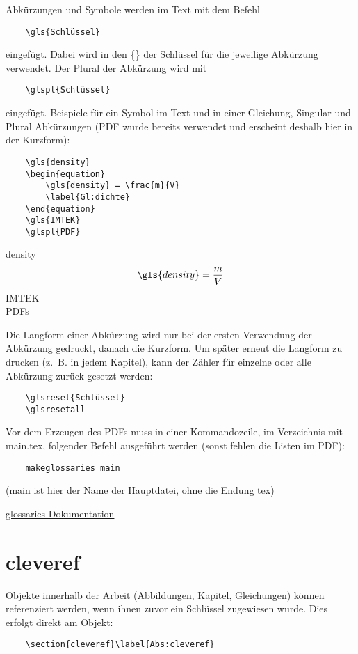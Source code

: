 Abkürzungen und Symbole werden im Text mit dem Befehl
\begin{verbatim}
	\gls{Schlüssel}
\end{verbatim}
eingefügt. Dabei wird in den \{\} der Schlüssel für die jeweilige Abkürzung verwendet. Der Plural der Abkürzung wird mit
\begin{verbatim}
	\glspl{Schlüssel}
\end{verbatim}
eingefügt. Beispiele für ein Symbol im Text und in einer Gleichung, Singular und Plural Abkürzungen (\glqq{}PDF\grqq{} wurde bereits verwendet und erscheint deshalb hier in der Kurzform):
\begin{verbatim}
	\gls{density}
	\begin{equation}
		\gls{density} = \frac{m}{V}
		\label{Gl:dichte}
	\end{equation}
	\gls{IMTEK}
	\glspl{PDF}
\end{verbatim}
\gls{density}
\begin{equation}
	\gls{density} = \frac{m}{V}
	\label{Gl:dichte}
\end{equation}
\gls{IMTEK}\\
\glspl{PDF}

Die Langform einer Abkürzung wird nur bei der ersten Verwendung der Abkürzung gedruckt, danach die Kurzform. Um später erneut die Langform zu drucken (z.~B. in jedem Kapitel), kann der Zähler für einzelne oder alle Abkürzung zurück gesetzt werden:
\begin{verbatim}
	\glsreset{Schlüssel}
	\glsresetall
\end{verbatim}

Vor dem Erzeugen des \glspl{PDF} muss in einer Kommandozeile, im Verzeichnis mit \glqq{}main.tex\glqq{}, folgender Befehl ausgeführt werden (sonst fehlen die Listen im \gls{PDF}):
\begin{verbatim}
	makeglossaries main
\end{verbatim}
(\glqq{}main\grqq{} ist hier der Name der Hauptdatei, ohne die Endung \glqq{}tex\grqq{})

\hyperlink{https://ctan.org/pkg/glossaries?lang=de}{glossaries Dokumentation}

\section{cleveref}\label{Abs:cleveref}
Objekte innerhalb der Arbeit (Abbildungen, Kapitel, Gleichungen) können referenziert werden, wenn ihnen zuvor ein Schlüssel zugewiesen wurde. Dies erfolgt direkt am Objekt:
\begin{verbatim}
	\section{cleveref}\label{Abs:cleveref}
\end{verbatim}

